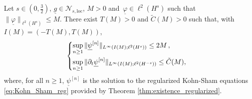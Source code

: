 \documentclass[10pt,a4paper]{amsart}
\newcommand{\Nloc}{\mathscr{N}_{s,\mathrm{loc}}}
\newcommand{\ulg}{\underline{g}}
\newcommand{\ulphi}{\underline{\varphi}}
\newcommand{\ulpsi}{\underline{\psi}}
\begin{document}
	\begin{lemma}\label{lem:interval-indep-n}
		Let $s\in(0,\frac32)$, $\ulg\in\Nloc$, $M>0$ and~$ \ulphi  \in \ell^2(H^{s}) $ such that $ \| \ulphi  \|_{\ell^2(H^{s})} \leq M$. There exist $T(M)>0$ and $\tilde{C}(M)>0$ such that, with $I(M)=(-T(M),T(M))$,
		\begin{equation}
			\begin{dcases} \label{est:uniform_est_theorem}
				\sup_{n \geq 1} \| \ulpsi^{[n]} \|_{L^{\infty}(I(M);\ell^2(H^{s}))} \leq 2M \, , \\
				\sup_{n \geq 1} \| \partial_t \ulpsi^{[n]} \|_{L^{\infty}(I(M);\ell^2(H^{-s}))} \leq \tilde{C}(M) ,
			\end{dcases}				
		\end{equation}
		where, for all $n \geq 1$, $\ulpsi^{[n]}$ is the solution to the regularized Kohn-Sham equations \eqref{eq:Kohn_Sham_reg} provided by Theorem \ref{thm:existence_regularized}.
	\end{lemma}
\end{document}
